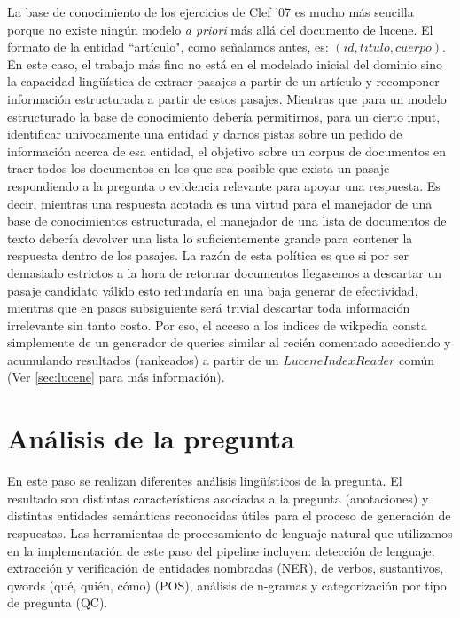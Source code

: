 \bigskip

La base de conocimiento de los ejercicios de Clef '07 es mucho más sencilla 
porque no existe ningún modelo \emph{a priori} más allá del documento de lucene.
El formato de la entidad ``artículo", como señalamos antes, es: $(id, titulo, cuerpo)$. 
En este caso, el trabajo más fino no está en el modelado inicial del dominio 
sino la capacidad lingüística de extraer pasajes a partir de un artículo y recomponer información
estructurada a partir de estos pasajes. Mientras que para un modelo estructurado la base de conocimiento
debería permitirnos, para un cierto input, identificar univocamente una entidad y darnos pistas sobre un pedido de
información acerca de esa entidad, el objetivo sobre un corpus de documentos en 
traer todos los documentos en los que sea posible que exista un pasaje respondiendo a la pregunta o
evidencia relevante para apoyar una respuesta. Es decir, mientras una respuesta acotada es una virtud para
el manejador de una base de conocimientos estructurada, el manejador de una lista de documentos de texto debería devolver
una lista lo suficientemente grande para contener la respuesta dentro de los pasajes. La razón de esta política es que si
por ser demasiado estrictos a la hora de retornar documentos llegasemos a descartar un pasaje candidato válido esto
redundaría en una baja generar de efectividad, mientras que en pasos subsiguiente será trivial descartar toda información irrelevante
sin tanto costo. Por eso, el acceso a los indices de wikpedia consta simplemente de un generador de queries similar al recién comentado
accediendo y acumulando resultados (rankeados) a partir de un $LuceneIndexReader$ común (Ver \ref{sec:lucene}  para más información).


\bigskip

\section{Análisis de la pregunta}

En este paso se realizan diferentes análisis lingüísticos de la pregunta.
El resultado son distintas características asociadas a la pregunta (anotaciones)
y distintas entidades semánticas reconocidas útiles para el proceso de generación de respuestas. 
Las herramientas de procesamiento de lenguaje natural que utilizamos en 
la implementación de este paso del pipeline 
incluyen: detección de lenguaje, extracción y verificación de entidades nombradas (NER), 
de verbos, sustantivos, qwords (qué, quién, cómo) (POS), análisis de n-gramas y categorización por tipo de pregunta (QC).

